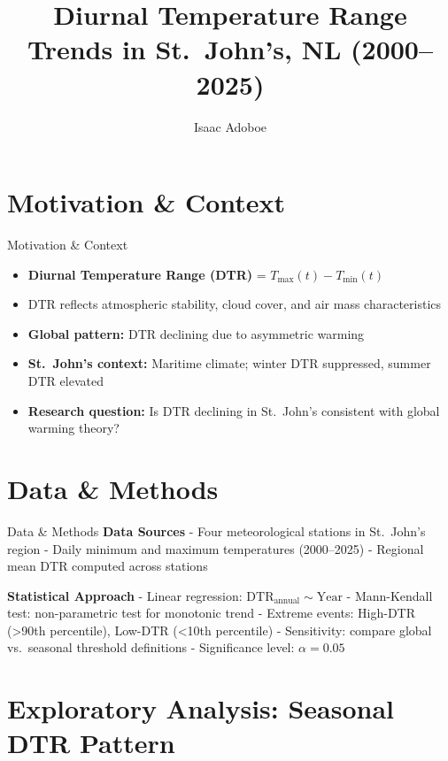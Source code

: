 \documentclass[
  ignorenonframetext,
  aspectratio=32,
]{beamer}
\title{Diurnal Temperature Range Trends in St.~John's, NL (2000--2025)}
\author{Isaac Adoboe}
\date{}
\providecommand{\tightlist}{%
  \setlength{\itemsep}{0pt}\setlength{\parskip}{0pt}}
\begin{document}
\frame{\titlepage}


\section{Motivation \& Context}\label{motivation-context}

\begin{frame}{Motivation \& Context}
\begin{itemize}
\tightlist
\item
  \textbf{Diurnal Temperature Range (DTR)} =
  \(T_{\max}(t) - T_{\min}(t)\)
\item
  DTR reflects atmospheric stability, cloud cover, and air mass
  characteristics
\item
  \textbf{Global pattern:} DTR declining due to asymmetric warming
\item
  \textbf{St.~John's context:} Maritime climate; winter DTR suppressed,
  summer DTR elevated
\item
  \textbf{Research question:} Is DTR declining in St.~John's consistent
  with global warming theory?
\end{itemize}
\end{frame}

\section{Data \& Methods}\label{data-methods}

\begin{frame}{Data \& Methods}
\textbf{Data Sources} - Four meteorological stations in St.~John's
region - Daily minimum and maximum temperatures (2000--2025) - Regional
mean DTR computed across stations

\textbf{Statistical Approach} - Linear regression:
\(\text{DTR}_{\text{annual}} \sim \text{Year}\) - Mann-Kendall test:
non-parametric test for monotonic trend - Extreme events: High-DTR
(\textgreater90th percentile), Low-DTR (\textless10th percentile) -
Sensitivity: compare global vs.~seasonal threshold definitions -
Significance level: \(\alpha = 0.05\)
\end{frame}

\section{Exploratory Analysis: Seasonal DTR
Pattern}\label{exploratory-analysis-seasonal-dtr-pattern}
\end{document}
